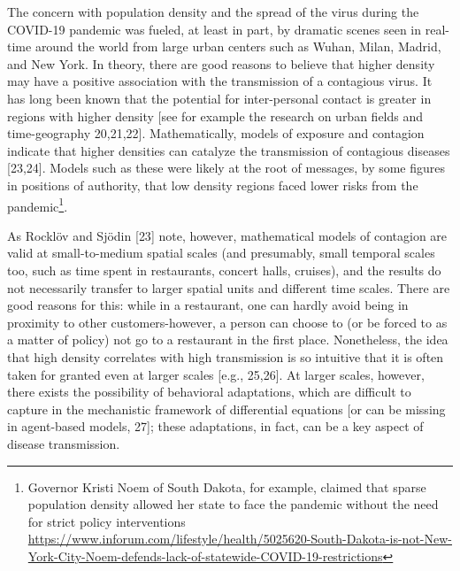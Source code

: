 \documentclass[10pt,letterpaper]{article}
\begin{document}
The concern with population density and the spread of the virus during
the COVID-19 pandemic was fueled, at least in part, by dramatic scenes
seen in real-time around the world from large urban centers such as
Wuhan, Milan, Madrid, and New York. In theory, there are good reasons to
believe that higher density may have a positive association with the
transmission of a contagious virus. It has long been known that the
potential for inter-personal contact is greater in regions with higher
density {[}see for example the research on urban fields and
time-geography 20,21,22{]}. Mathematically, models of exposure and
contagion indicate that higher densities can catalyze the transmission
of contagious diseases {[}23,24{]}. Models such as these were likely at
the root of messages, by some figures in positions of authority, that
low density regions faced lower risks from the pandemic\footnote{Governor
  Kristi Noem of South Dakota, for example, claimed that sparse
  population density allowed her state to face the pandemic without the
  need for strict policy interventions
  \url{https://www.inforum.com/lifestyle/health/5025620-South-Dakota-is-not-New-York-City-Noem-defends-lack-of-statewide-COVID-19-restrictions}}.

As Rocklöv and Sjödin {[}23{]} note, however, mathematical models of
contagion are valid at small-to-medium spatial scales (and presumably,
small temporal scales too, such as time spent in restaurants, concert
halls, cruises), and the results do not necessarily transfer to larger
spatial units and different time scales. There are good reasons for
this: while in a restaurant, one can hardly avoid being in proximity to
other customers-however, a person can choose to (or be forced to as a
matter of policy) not go to a restaurant in the first place.
Nonetheless, the idea that high density correlates with high
transmission is so intuitive that it is often taken for granted even at
larger scales {[}e.g., 25,26{]}. At larger scales, however, there exists
the possibility of behavioral adaptations, which are difficult to
capture in the mechanistic framework of differential equations {[}or can
be missing in agent-based models, 27{]}; these adaptations, in fact, can
be a key aspect of disease transmission.
\end{document}
